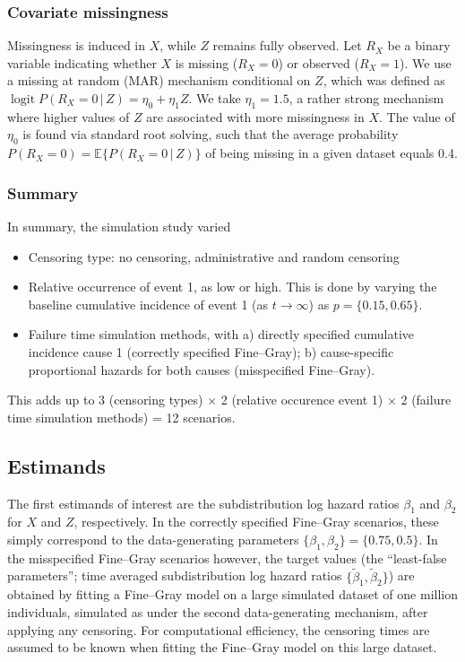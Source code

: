 \documentclass[
  letterpaper,
  DIV=11,
  numbers=noendperiod]{scrreprt}
\providecommand{\tightlist}{%
  \setlength{\itemsep}{0pt}\setlength{\parskip}{0pt}}\usepackage{longtable,booktabs,array}
\DeclareMathOperator{\logit}{logit}
\newcommand{\given}{\,|\,}
\begin{document}
\subsubsection{Covariate missingness}\label{covariate-missingness}

Missingness is induced in \(X\), while \(Z\) remains fully observed. Let
\(R_X\) be a binary variable indicating whether \(X\) is missing
(\(R_X = 0\)) or observed (\(R_X = 1\)). We use a missing at random
(MAR) mechanism conditional on \(Z\), which was defined as
\(\logit P(R_X = 0 \given Z) = \eta_0 + \eta_1 Z\). We take
\(\eta_1 = 1.5\), a rather strong mechanism where higher values of \(Z\)
are associated with more missingness in \(X\). The value of \(\eta_0\)
is found via standard root solving, such that the average probability
\(P(R_X = 0) = \mathbb{E}\{P(R_X = 0 \given Z)\}\) of being missing in a
given dataset equals 0.4.

\subsubsection{Summary}\label{summary}

In summary, the simulation study varied

\begin{itemize}
\tightlist
\item
  Censoring type: no censoring, administrative and random censoring
\item
  Relative occurrence of event 1, as low or high. This is done by
  varying the baseline cumulative incidence of event 1 (as
  \(t \rightarrow \infty\)) as \(p = \{0.15, 0.65\}\).
\item
  Failure time simulation methods, with a) directly specified cumulative
  incidence cause 1 (correctly specified Fine--Gray); b) cause-specific
  proportional hazards for both causes (misspecified Fine--Gray).
\end{itemize}

This adds up to 3 (censoring types) \(\times\) 2 (relative occurence
event 1) \(\times\) 2 (failure time simulation methods) = 12 scenarios.

\subsection{Estimands}\label{estimands-1}

The first estimands of interest are the subdistribution log hazard
ratios \(\beta_{1}\) and \(\beta_{2}\) for \(X\) and \(Z\),
respectively. In the correctly specified Fine--Gray scenarios, these
simply correspond to the data-generating parameters
\(\{\beta_{1},\beta_{2}\} = \{0.75, 0.5\}\). In the misspecified
Fine--Gray scenarios however, the target values (the ``least-false
parameters''; time averaged subdistribution log hazard ratios
\(\{\tilde{\beta}_{1},\tilde{\beta}_{2}\}\)) are obtained by fitting a
Fine--Gray model on a large simulated dataset of one million
individuals, simulated as under the second data-generating mechanism,
after applying any censoring. For computational efficiency, the
censoring times are assumed to be known when fitting the Fine--Gray
model on this large dataset.
\end{document}
